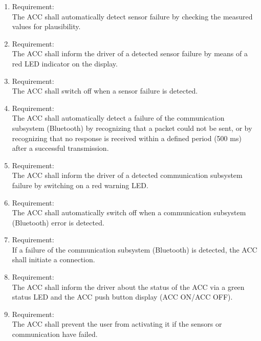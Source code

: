 \begin{enumerate}[label*=\arabic*.]
        \item \label{req.2} Requirement: \\
        The ACC shall automatically detect sensor failure by checking the measured values for plausibility.  \\
	 	\item \label{req.3} Requirement: \\
        The ACC shall inform the driver of a detected sensor failure by means of a red LED indicator on the display. \\
        \item \label{req.4} Requirement: \\
        The ACC shall switch off when a sensor failure is detected. \\
        \item \label{req.5} Requirement: \\
        The ACC shall automatically detect a failure of the communication subsystem (Bluetooth) by recognizing that a packet could not be sent, or by recognizing that no response is received within a defined period (500 ms) after a successful transmission. \\
        \item \label{req.6} Requirement: \\
        The ACC shall inform the driver of a detected communication subsystem failure by switching on a red warning LED. \\
        \item \label{req.7} Requirement: \\
        The ACC shall automatically switch off when a communication subsystem (Bluetooth) error is detected. \\
        \item \label{req.8} Requirement: \\
        If a failure of the communication subsystem (Bluetooth) is detected, the ACC shall initiate a connection. \\
        \item \label{req.9} Requirement: \\
        The ACC shall inform the driver about the status of the ACC via a green status LED and the ACC push button display (ACC ON/ACC OFF). \\
        \item \label{req.10} Requirement: \\
        The ACC shall prevent the user from activating it if the sensors or communication have failed. \\

\end{enumerate}
